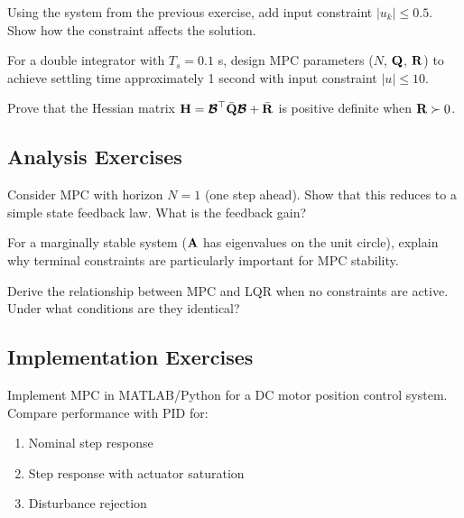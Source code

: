 \begin{exercise}
Using the system from the previous exercise, add input constraint $|u_k| \leq 0.5$. Show how the constraint affects the solution.
\end{exercise}

\begin{exercise}
For a double integrator with $T_s = 0.1$ s, design MPC parameters ($N$, $\mathbf{Q}$, $\mathbf{R}$) to achieve settling time approximately 1 second with input constraint $|u| \leq 10$.
\end{exercise}

\begin{exercise}
Prove that the Hessian matrix $\mathbf{H} = \boldsymbol{\mathcal{B}}^\top\bar{\mathbf{Q}}\boldsymbol{\mathcal{B}} + \bar{\mathbf{R}}$ is positive definite when $\mathbf{R} \succ 0$.
\end{exercise}

\subsection{Analysis Exercises}

\begin{exercise}
Consider MPC with horizon $N=1$ (one step ahead). Show that this reduces to a simple state feedback law. What is the feedback gain?
\end{exercise}

\begin{exercise}
For a marginally stable system ($\mathbf{A}$ has eigenvalues on the unit circle), explain why terminal constraints are particularly important for MPC stability.
\end{exercise}

\begin{exercise}
Derive the relationship between MPC and LQR when no constraints are active. Under what conditions are they identical?
\end{exercise}

\subsection{Implementation Exercises}

\begin{exercise}
Implement MPC in MATLAB/Python for a DC motor position control system. Compare performance with PID for:
\begin{enumerate}
    \item Nominal step response
    \item Step response with actuator saturation
    \item Disturbance rejection
\end{enumerate}
\end{exercise}

